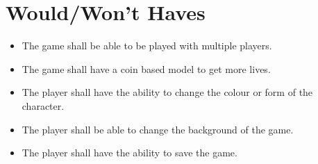 \section{Would/Won't Haves}
\begin{itemize}
\itemsep0em 
	\item The game shall be able to be played with multiple players.
	\item The game shall have a coin based model to get more lives.
	\item The player shall have the ability to change the colour or form of the character.
	\item The player shall be able to change the background of the game.
	\item The player shall have the ability to save the game.
\end{itemize}
